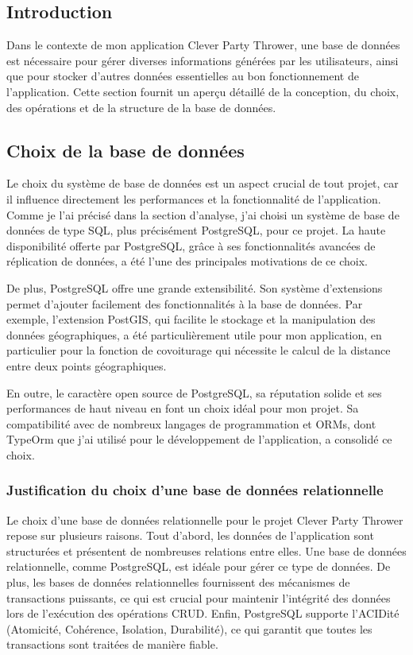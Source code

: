 \subsection{Introduction}\label{subsec:introduction_base_de_donnee}
Dans le contexte de mon application Clever Party Thrower, une base de données est nécessaire pour gérer diverses informations générées par les utilisateurs,
ainsi que pour stocker d'autres données essentielles au bon fonctionnement de l'application.
Cette section fournit un aperçu détaillé de la conception, du choix, des opérations et de la structure de la base de données.

\subsection{Choix de la base de données}\label{subsec:choix-de-la-base-de-donnee}
Le choix du système de base de données est un aspect crucial de tout projet, car il influence directement les performances et la fonctionnalité de l'application.
Comme je l'ai précisé dans la section d'analyse, j'ai choisi un système de base de données de type SQL, plus précisément PostgreSQL, pour ce projet.
La haute disponibilité offerte par PostgreSQL, grâce à ses fonctionnalités avancées de réplication de données, a été l'une des principales motivations de ce choix.

De plus, PostgreSQL offre une grande extensibilité.
Son système d'extensions permet d'ajouter facilement des fonctionnalités à la base de données.
Par exemple, l'extension PostGIS, qui facilite le stockage et la manipulation des données géographiques, a été particulièrement utile pour mon application,
en particulier pour la fonction de covoiturage qui nécessite le calcul de la distance entre deux points géographiques.

En outre, le caractère open source de PostgreSQL, sa réputation solide et ses performances de haut niveau en font un choix idéal pour mon projet.
Sa compatibilité avec de nombreux langages de programmation et ORMs, dont TypeOrm que j'ai utilisé pour le développement de l'application, a consolidé ce choix.

\subsubsection{Justification du choix d'une base de données relationnelle}\label{subsubsec:justification-choix-relational-db}
Le choix d'une base de données relationnelle pour le projet Clever Party Thrower repose sur plusieurs raisons.
Tout d'abord, les données de l'application sont structurées et présentent de nombreuses relations entre elles.
Une base de données relationnelle, comme PostgreSQL, est idéale pour gérer ce type de données.
De plus, les bases de données relationnelles fournissent des mécanismes de transactions puissants, ce qui est crucial pour maintenir
l'intégrité des données lors de l'exécution des opérations CRUD. Enfin,
PostgreSQL supporte l'ACIDité (Atomicité, Cohérence, Isolation, Durabilité), ce qui garantit que toutes les transactions sont traitées de manière fiable.

